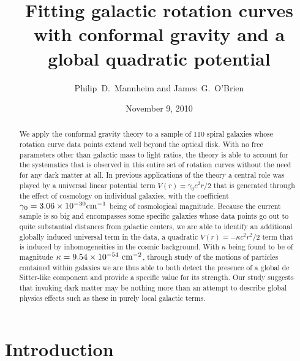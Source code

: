 \documentclass[preprint,aps]{revtex4}
\begin{document}
\title{Fitting galactic rotation curves with conformal gravity and a global quadratic potential}

\author{Philip~D.~Mannheim and James~G.~O'Brien}


\date{November 9, 2010}

\begin{abstract}
We apply the conformal gravity theory to a sample of 110 spiral galaxies whose rotation curve data points extend well beyond the optical disk. With no free parameters other than galactic mass to light ratios, the theory is able to account for the systematics that is observed in this entire set of rotation curves without the need for any dark matter at all. In previous applications of the theory a central role was played by a universal linear potential term $V(r)=\gamma_0 c^2r/2$ that is generated through the effect of cosmology on individual galaxies, with the coefficient $\gamma_0=3.06\times 10^{-30}{\rm cm}^{-1}$ being of cosmological magnitude. Because the current sample is so big and encompasses some specific galaxies whose data points go out to  quite substantial distances from galactic centers, we are able to identify an additional globally induced universal term in the data, a quadratic $V(r)=-\kappa c^2r^2/2$ term that is induced by inhomogeneities in the cosmic background. With $\kappa$ being found to be of magnitude $\kappa=9.54\times 10^{-54}~{\rm cm}^{-2}$, through study of the motions of particles contained within galaxies we are thus able to both detect the presence of a global de Sitter-like component and provide a specific value for its strength. Our study suggests that invoking dark matter may be nothing more than an attempt to describe global physics effects such as these in purely local galactic terms.
\end{abstract}

\maketitle

\section{Introduction}
\label{s1}
\end{document}
